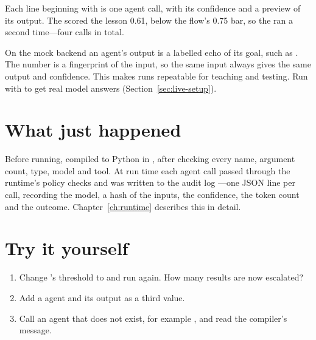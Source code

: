 Each line beginning with  is one agent call, with its confidence and a preview of its output. The  scored the lesson 0.61, below the flow's 0.75 bar, so the  ran a second time---four calls in total.

\begin{note}
On the mock backend an agent's output is a labelled echo of its goal, such as . The number is a fingerprint of the input, so the same input always gives the same output and confidence. This makes runs repeatable for teaching and testing. Run with  to get real model answers (Section~\ref{sec:live-setup}).
\end{note}

\section{What just happened}

Before running,  compiled  to Python in , after checking every name, argument count, type, model and tool. At run time each agent call passed through the runtime's policy checks and was written to the audit log ---one JSON line per call, recording the model, a hash of the inputs, the confidence, the token count and the outcome. Chapter~\ref{ch:runtime} describes this in detail.

\section{Try it yourself}

\begin{enumerate}
  \item Change 's threshold to  and run again. How many results are now escalated?
  \item Add a  agent and  its output as a third value.
  \item Call an agent that does not exist, for example , and read the compiler's message.
\end{enumerate}
